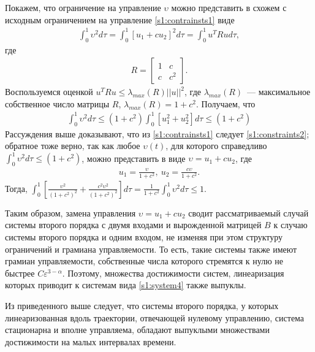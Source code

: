 \documentclass[../main.tex]{subfiles}
\begin{document}
 
Покажем, что ограничение на управление $ \upsilon $ можно представить в схожем с исходным ограничением на управление \eqref{s1:contrainsts1} виде
\begin{gather*}
 \int_{0}^{1} \upsilon ^2 d \tau = \int_{0}^{1} \left[ u_1 + c u_2 \right]^2 d \tau = \int_{0}^{1} u^T R u d \tau,
\end{gather*}
где 
\begin{gather*}
 R = \left[ \begin{array}{cc}
 1 & c \\ 
 c & c^2
 \end{array} \right].
\end{gather*}
Воспользуемся оценкой $
u^T R u \leqslant \lambda_{max}(R) || u ||^2 $, где $ \lambda_{max}(R) $~--- максимальное собственное число матрицы $ R $, $ \lambda_{max}(R) = 1 + c^2 $.
Получаем, что
\begin{gather}\label{s1:constraints2}
 \int_{0}^{1} \upsilon ^2 d \tau \leqslant (1 + c^2) \int_{0}^{1} \left[ u_1^2 + u_2^2 \right] d \tau \leqslant (1 + c^2)
\end{gather}
Рассуждения выше доказывают, что из \eqref{s1:contrainsts1} следует \eqref{s1:constraints2}; обратное тоже верно, так как любое $ \upsilon(t) $, для которого справедливо $ \int_{0}^{1} \upsilon ^2 d \tau \leqslant (1 + c^2) $, можно представить в виде $ \upsilon = u_1 + c u_2 $, где 
\begin{gather*}
 u_1 = \frac{\upsilon}{1+c^2}, \ u_2 = \frac{c \upsilon}{1+c^2}.
\end{gather*}
Тогда, $ \int_0^1 \left[ \frac{\upsilon^2}{(1+c^2)^2} + \frac{c^2 \upsilon^2}{(1+c^2)^2}\right] d \tau = \frac{1}{1+c^2} \int_{0}^{1} \upsilon ^2 d \tau \leqslant 1 $. 
 
Таким образом, замена управления $ \upsilon = u_1 + c u_2 $ сводит рассматриваемый случай системы второго порядка с двумя входами и вырожденной матрицей $ B $ к случаю системы второго порядка и одним входом, не изменяя при этом структуру ограничений и грамиана управляемости.
То есть, такие системы также имеют грамиан управляемости, собственные числа которого стремятся к нулю не быстрее $ C \varepsilon^{3-\alpha} $.
Поэтому, множества достижимости систем, линеаризация которых приводит к системам вида \eqref{s1:system4} также выпуклы.

Из приведенного выше следует, что системы второго порядка, у которых линеаризованная вдоль траектории, отвечающей нулевому управлению, система стационарна и вполне управляема, обладают выпуклыми множествами достижимости на малых интервалах времени.
\end{document}
